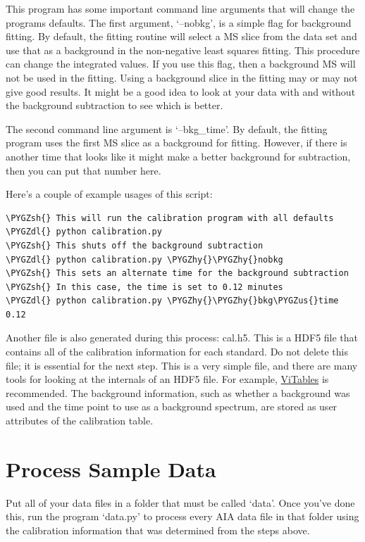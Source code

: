 \documentclass[letterpaper,10pt,english]{sphinxmanual}
\def\PYGZus{\char`\_}
\def\PYGZsh{\char`\#}
\def\PYGZdl{\char`\$}
\def\PYGZhy{\char`\-}
\begin{document}
This program has some important command line arguments that will change the
programs defaults. The first argument, `--nobkg', is a simple flag for
background fitting. By default, the fitting routine will select a MS slice
from the data set and use that as a background in the non-negative least
squares fitting. This procedure can change the integrated values. If you use
this flag, then a background MS will not be used in the fitting. Using a
background slice in the fitting may or may not give good results. It might be
a good idea to look at your data with and without the background subtraction
to see which is better.

The second command line argument is `--bkg\_time'. By default, the fitting
program uses the first MS slice as a background for fitting.  However, if
there is another time that looks like it might make a better background for
subtraction, then you can put that number here.

Here's a couple of example usages of this script:

\begin{Verbatim}[commandchars=\\\{\}]
\PYGZsh{} This will run the calibration program with all defaults
\PYGZdl{} python calibration.py
\PYGZsh{} This shuts off the background subtraction
\PYGZdl{} python calibration.py \PYGZhy{}\PYGZhy{}nobkg
\PYGZsh{} This sets an alternate time for the background subtraction
\PYGZsh{} In this case, the time is set to 0.12 minutes
\PYGZdl{} python calibration.py \PYGZhy{}\PYGZhy{}bkg\PYGZus{}time 0.12
\end{Verbatim}

Another file is also generated during this process: cal.h5. This is a HDF5
file that contains all of the calibration information for each standard. Do
not delete this file; it is essential for the next step. This is a very simple
file, and there are many tools for looking at the internals of an HDF5 file.
For example, \href{http://vitables.org/}{ViTables} is recommended. The background
information, such as whether a background was used and the time point to use
as a background spectrum, are stored as user attributes of the calibration
table.


\chapter{Process Sample Data}
\label{autoint:vitables}\label{autoint::doc}\label{autoint:process-sample-data}
Put all of your data files in a folder that must be called `data'. Once you've
done this, run the program `data.py' to process every AIA data file in that
folder using the calibration information that was determined from the steps
above.
\end{document}
